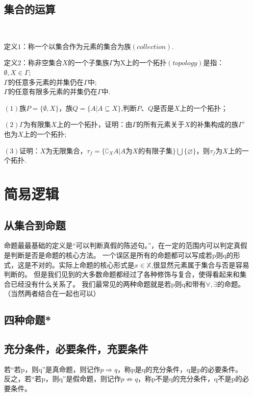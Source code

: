 \clearpage
\subsection{集合的运算}
\clearpage
\hw
\begin{homework}
    \ 

    定义$1$：称一个以集合作为元素的集合为族$(collection)$.

    定义$2$：称非空集合$X$的一个子集族$\Gamma$为X上的一个拓扑$(topology)$是指：\\
$ \emptyset,X\in \Gamma$;\\
$\Gamma$的任意多元素的并集仍在$\Gamma$中;\\
$\Gamma$的任意有限多元素的并集仍在$\Gamma$中.

    $(1)$族$P=\{\emptyset,X\}$，族$Q=\{A|A\subseteq X\}$,判断$P$、$Q$是否是$X$上的一个拓扑；
    
    $(2)$$\Gamma$为有限集$X$上的一个拓扑，证明：由\(\Gamma\)的所有元素关于$X$的补集构成的族$\Gamma^c$也为$X$上的一个拓扑;

    $(3)$证明：$X$为无限集合，$\tau_f=\{\complement_X A|A\text{为}X\text{的有限子集}\}\bigcup\{\varnothing\}$，则$\tau_f$为$X$上的一个拓扑.
\end{homework}



\clearpage

\section{简易逻辑}
\subsection{从集合到命题}
命题最最基础的定义是“可以判断真假的陈述句。”，在一定的范围内可以判定真假是判断是否是命题的核心方法。
一个误区是所有的命题都可以写成若p则q的形式，这是不对的。实际上命题的核心形式是$x \in \mathbb{X} $,很显然元素属于集合与否是容易判断的。
但是我们见到的大多数命题都经过了各种修饰与复合，使得看起来和集合已经没有什么关系了。
我们最常见的两种命题就是若p则q和带有$\forall,\exists $的命题。（当然两者结合在一起也可以）
\clearpage
\subsection{四种命题*}

\clearpage
\subsection{充分条件，必要条件，充要条件}
\begin{definition}
    若“若p，则q”是真命题，则记作$p \Rightarrow q$，称p是q的充分条件，q是p的必要条件。
反之，若“若p，则q”是假命题，则记作$p \not\Rightarrow  q$，称p不是q的充分条件，q不是p的必要条件。
\end{definition}

